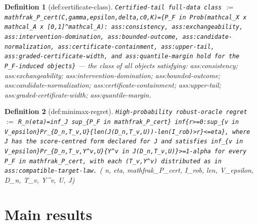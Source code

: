 \documentclass{article}
\newtheorem{definition}{Definition}
\begin{document}
\begin{definition}[def:certificate-class]\label{def:certificate-class}
\texttt{Certified-tail full-data class} $:=$ \texttt{mathfrak\_P\_cert(C,gamma,epsilon,delta,c0,K)=\{P\_F in Prob(mathcal\_X x mathcal\_A x [0,1]\textasciicircum{}mathcal\_A): ass:consistency, ass:exchangeability, ass:intervention-domination, ass:bounded-outcome, ass:candidate-normalization, ass:certificate-containment, ass:upper-tail, ass:graded-certificate-width, and ass:quantile-margin hold for the P\_F-induced objects\}} --- the class of all objects satisfying: ass:consistency; ass:exchangeability; ass:intervention-domination; ass:bounded-outcome; ass:candidate-normalization; ass:certificate-containment; ass:upper-tail; ass:graded-certificate-width; ass:quantile-margin.
\end{definition}

\begin{definition}[def:minimax-regret]\label{def:minimax-regret}
\texttt{High-probability robust-oracle regret} $:=$ \texttt{R\_n(eta)=inf\_J sup\_\{P\_F in mathfrak\_P\_cert\} inf\{r>=0:sup\_\{v in V\_epsilon\}Pr\_\{D\_n,T\_v,U\}\{len(J(D\_n,T\_v,U))-len(I\_rob)>r\}<=eta\}, where J has the score-centred form declared for J and satisfies inf\_\{v in V\_epsilon\}Pr\_\{D\_n,T\_v,Y\textasciicircum{}v,U\}\{Y\textasciicircum{}v in J(D\_n,T\_v,U)\}>=1-alpha for every P\_F in mathfrak\_P\_cert, with each (T\_v,Y\textasciicircum{}v) distributed as in ass:compatible-target-law.} \quad ( n, eta, mathfrak\_P\_cert, I\_rob, len, V\_epsilon, D\_n, T\_v, Y\textasciicircum{}v, U, J)
\end{definition}

\section{Main results}
\end{document}
